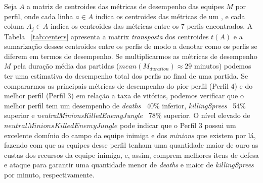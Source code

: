 Seja $A$ a matriz de centroides das métricas de desempenho das equipes $M$ por perfil, onde cada linha $a \in A$ indica os centroides das métricas de um , e cada coluna $A_j \in A$ indica os centroides das métricas entre os 7 perfis encontrados. A Tabela ~\ref{tab:centers} apresenta a matrix \textit{transposta} dos centroides $t(A)$ e a sumarização desses centroides entre os perfis de modo a  denotar como os perfis se diferem em termos de desempenho. Se multiplicarmos as métricas de desempenho $M$ pela duração média das partidas ($mean(M_{duration}) \approx 29$ minutos) podemos ter uma estimativa do desempenho total dos perfis no final de uma partida. Se compararmos as principais métricas de desempenho do pior perfil (Perfil 4) e do melhor perfil (Perfil 3) em relação a taxa de vitórias, podemos verificar que o melhor perfil tem um desempenho de \textit{deaths} ~40\% inferior, \textit{killingSprees} ~54\% superior e \textit{neutralMinionsKilledEnemyJungle} ~78\% superior. O nível elevado de $neutralMinionsKilledEnemyJungle$ pode indicar que o Perfil 3 possui um excelente domínio do campo da equipe inimiga e dos \textit{minions} que existem por lá, fazendo com que as equipes desse perfil tenham uma quantidade maior de ouro as custas dos recursos da equipe inimiga, e, assim, comprem melhores itens de defesa e ataque para garantir uma quantidade menor de \textit{deaths} e maior de \textit{killingSprees} por minuto, respectivamente.


